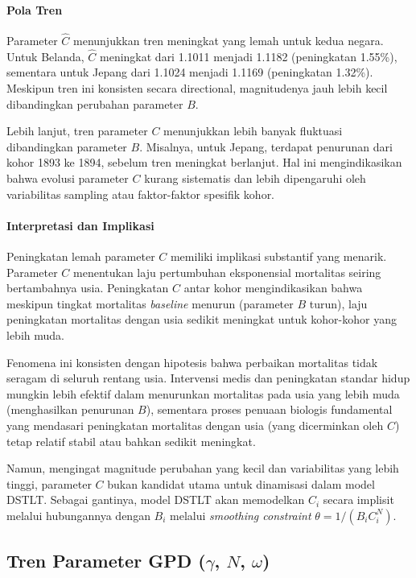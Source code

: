 \paragraph{Pola Tren}
Parameter $\hat{C}$ menunjukkan tren meningkat yang lemah untuk kedua negara. Untuk Belanda, $\hat{C}$ meningkat dari 1.1011 menjadi 1.1182 (peningkatan 1.55\%), sementara untuk Jepang dari 1.1024 menjadi 1.1169 (peningkatan 1.32\%). Meskipun tren ini konsisten secara directional, magnitudenya jauh lebih kecil dibandingkan perubahan parameter $B$.

Lebih lanjut, tren parameter $C$ menunjukkan lebih banyak fluktuasi dibandingkan parameter $B$. Misalnya, untuk Jepang, terdapat penurunan dari kohor 1893 ke 1894, sebelum tren meningkat berlanjut. Hal ini mengindikasikan bahwa evolusi parameter $C$ kurang sistematis dan lebih dipengaruhi oleh variabilitas sampling atau faktor-faktor spesifik kohor.

\paragraph{Interpretasi dan Implikasi}
Peningkatan lemah parameter $C$ memiliki implikasi substantif yang menarik. Parameter $C$ menentukan laju pertumbuhan eksponensial mortalitas seiring bertambahnya usia. Peningkatan $C$ antar kohor mengindikasikan bahwa meskipun tingkat mortalitas \textit{baseline} menurun (parameter $B$ turun), laju peningkatan mortalitas dengan usia sedikit meningkat untuk kohor-kohor yang lebih muda.

Fenomena ini konsisten dengan hipotesis bahwa perbaikan mortalitas tidak seragam di seluruh rentang usia. Intervensi medis dan peningkatan standar hidup mungkin lebih efektif dalam menurunkan mortalitas pada usia yang lebih muda (menghasilkan penurunan $B$), sementara proses penuaan biologis fundamental yang mendasari peningkatan mortalitas dengan usia (yang dicerminkan oleh $C$) tetap relatif stabil atau bahkan sedikit meningkat.

Namun, mengingat magnitude perubahan yang kecil dan variabilitas yang lebih tinggi, parameter $C$ bukan kandidat utama untuk dinamisasi dalam model DSTLT. Sebagai gantinya, model DSTLT akan memodelkan $C_i$ secara implisit melalui hubungannya dengan $B_i$ melalui \textit{smoothing constraint} $\theta = 1/(B_i C_i^N)$.

\subsection{Tren Parameter GPD ($\gamma$, $N$, $\omega$)}

